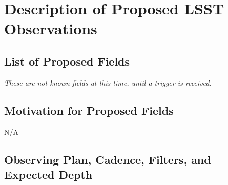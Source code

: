 \documentclass [11pt]{article}
\begin{document}

%



\section{Description of Proposed LSST Observations}

\subsection{List of Proposed Fields}


{\it These are not known fields at this time, until a trigger is received.}

\subsection{Motivation for Proposed Fields}

%

N/A

\subsection{Observing Plan, Cadence, Filters, and Expected Depth}
\end{document}
